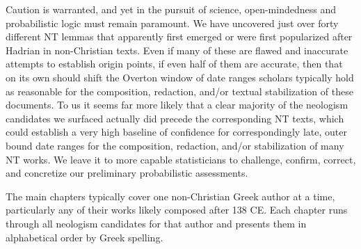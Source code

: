Caution is warranted, and yet in the pursuit of science, %
open-mindedness and probabilistic logic must remain paramount. %
We have uncovered just over forty different NT lemmas that apparently first emerged %
or were first popularized after Hadrian in non-Christian texts. %
Even if many of these are flawed and inaccurate attempts to establish origin points, %
if even half of them are accurate, then that on its own should shift the Overton window %
of date ranges scholars typically hold as reasonable for the composition, %
redaction, and/or textual stabilization of these documents. %
To us it seems far more likely that a clear majority of the neologism candidates %
we surfaced actually did precede the corresponding NT texts, %
which could establish a very high baseline of confidence for correspondingly late, %
outer bound date ranges for the composition, redaction, and/or stabilization of many NT works. %
We leave it to more capable statisticians to challenge, confirm, %
correct, and concretize our preliminary probabilistic assessments. %

The main chapters typically cover one non-Christian Greek author at a time, %
particularly any of their works likely composed after 138 CE. %
Each chapter runs through all neologism candidates for that author %
and presents them in alphabetical order by Greek spelling. %
